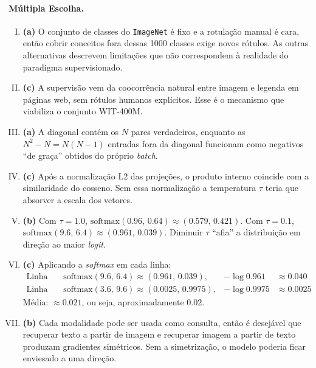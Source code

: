 \documentclass{dlproblemset}
\begin{document}
\paragraph{Múltipla Escolha.}
\begin{enumerate}[I)]
    \item \textbf{(a)} O conjunto de classes do \texttt{ImageNet} é fixo e a rotulação manual é cara, então cobrir conceitos fora dessas 1000 classes exige novos rótulos. As outras alternativas descrevem limitações que não correspondem à realidade do paradigma supervisionado.

    \item \textbf{(c)} A supervisão vem da coocorrência natural entre imagem e legenda em páginas web, sem rótulos humanos explícitos. Esse é o mecanismo que viabiliza o conjunto WIT-400M.

    \item \textbf{(a)} A diagonal contém os $N$ pares verdadeiros, enquanto as $N^2 - N = N(N-1)$ entradas fora da diagonal funcionam como negativos ``de graça'' obtidos do próprio \textit{batch}.

    \item \textbf{(c)} Após a normalização L2 das projeções, o produto interno coincide com a similaridade do cosseno. Sem essa normalização a temperatura $\tau$ teria que absorver a escala dos vetores.

    \item \textbf{(b)} Com $\tau = 1.0$, $\mathrm{softmax}(0.96,\, 0.64) \approx (0.579,\, 0.421)$. Com $\tau = 0.1$, $\mathrm{softmax}(9.6,\, 6.4) \approx (0.961,\, 0.039)$. Diminuir $\tau$ ``afia'' a distribuição em direção ao maior \textit{logit}.

    \item \textbf{(c)} Aplicando a \textit{softmax} em cada linha:
    \begin{align*}
        \text{Linha 1:}\quad & \mathrm{softmax}(9.6,\, 6.4) \approx (0.961,\, 0.039), & -\log 0.961 &\approx 0.040 \\
        \text{Linha 2:}\quad & \mathrm{softmax}(3.6,\, 9.6) \approx (0.0025,\, 0.9975), & -\log 0.9975 &\approx 0.0025
    \end{align*}
    Média: $\approx 0.021$, ou seja, aproximadamente $0.02$.

    \item \textbf{(b)} Cada modalidade pode ser usada como consulta, então é desejável que recuperar texto a partir de imagem e recuperar imagem a partir de texto produzam gradientes simétricos. Sem a simetrização, o modelo poderia ficar enviesado a uma direção.


\end{enumerate}
\end{document}
